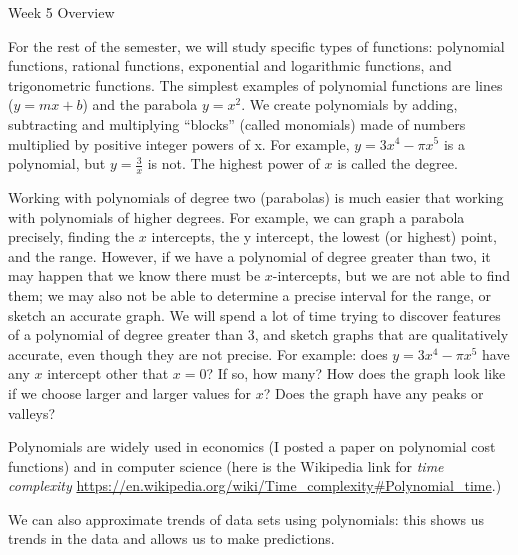 \documentclass[11pt,dvipsnames]{article}
\newenvironment{myfont}{\fontfamily{frc}\selectfont}{\par}
\begin{document}
\begin{center}
\begin{myfont}
{\Large Week 5 Overview }	
\end{myfont}
\end{center}


For the rest of the semester, we will study specific types of functions: polynomial functions, rational functions, exponential and logarithmic functions, and trigonometric functions. The simplest examples of polynomial functions are lines ($y = mx + b$) and the parabola  $\displaystyle y = x^2$. We create polynomials by adding, subtracting and multiplying \enquote{blocks} (called monomials) made of numbers multiplied by positive integer powers of x. For example, $\displaystyle y = 3x^4 - \pi x^5$ is a polynomial, but $\displaystyle y=\frac{3}{x}$ is not. The highest power of $x$ is called the degree.


Working with polynomials of degree two (parabolas) is much easier that working with polynomials of higher degrees. For example, we can graph a parabola precisely, finding the $x$ intercepts, the y intercept, the lowest (or highest) point, and the range. However, if we have a polynomial of degree greater than two, it may happen that we know there must be $x$-intercepts, but we are not able to find them; we may also not be able to determine a precise interval for the range, or sketch an accurate graph. We will spend a lot of time trying to discover features of a polynomial of degree greater than 3, and sketch graphs that are qualitatively accurate, even though they are not precise. For example: does $\displaystyle y = 3x^4 - \pi x^5$ have any $x$ intercept other that $x = 0$? If so, how many? How does the graph look like if we choose larger and larger values for $x$? Does the graph have any peaks or valleys? 

Polynomials are widely used in economics (I posted a paper on polynomial cost functions) and in computer science (here is the Wikipedia link for {\emph{time complexity}} \url{https://en.wikipedia.org/wiki/Time_complexity#Polynomial_time}.) 

We can also approximate trends of data sets using polynomials: this shows us trends in the data and allows us to make predictions.
\end{document}

